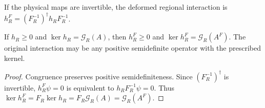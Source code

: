 \begin{definition}%
    \label{def:peps_deformed_region_interaction}
    \leanok
    If the physical maps are invertible, the deformed regional
    interaction is $h_R^F=(F_R^{-1})^\dagger h_RF_R^{-1}$.
\end{definition}

\begin{lemma}%
    \label{thm:peps_deformed_region_interaction}
    \leanok
    If $h_R\geq0$ and $\ker h_R=\mathcal G_R(A)$, then
    $h_R^F\geq0$ and $\ker h_R^F=\mathcal G_R(A^F)$.
    The original interaction may be any positive semidefinite operator
    with the prescribed kernel.
\end{lemma}

\begin{proof}\leanok
    Congruence preserves positive semidefiniteness. Since
    $(F_R^{-1})^\dagger$ is invertible,
    $h_R^F\psi=0$ is equivalent to $h_RF_R^{-1}\psi=0$.
    Thus $\ker h_R^F=F_R\ker h_R
        =F_R\mathcal G_R(A)=\mathcal G_R(A^F)$.
\end{proof}
